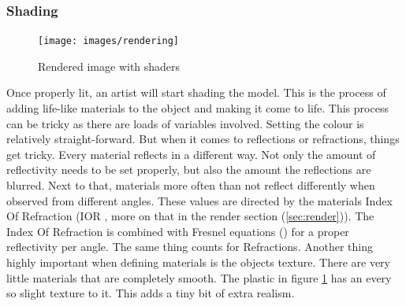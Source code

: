 
\subsubsection{Shading}

\begin{figure}
\vspace{-1cm}
\centering
\texttt{[image: images/rendering]}
\caption{Rendered image with shaders}
\label{figure:lighting_rendered}
\end{figure}

Once properly lit, an artist will start shading the model. This is the process of adding life-like materials to the object and making it come to life. This process can be tricky as there are loads of variables involved. Setting the colour is relatively straight-forward. But when it comes to reflections or refractions, things get tricky. Every material reflects in a different way. Not only the amount of reflectivity needs to be set properly, but also the amount the reflections are blurred. Next to that, materials more often than not reflect differently when observed from different angles. These values are directed by the materials Index Of Refraction (IOR \cite{refractiveIndex}, more on that in the render section (\ref{sec:render})). The Index Of Refraction is combined with Fresnel equations (\cite{fresnelEquations}) for a proper reflectivity per angle. The same thing counts for Refractions.
Another thing highly important when defining materials is the objects texture. There are very little materials that are completely smooth. The plastic in figure \ref{figure:lighting_rendered} has an every so slight texture to it. This adds a tiny bit of extra realism.


